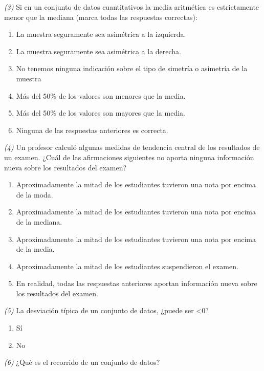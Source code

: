 \documentclass[
]{book}
\providecommand{\tightlist}{%
  \setlength{\itemsep}{0pt}\setlength{\parskip}{0pt}}
\theoremstyle{definition}
\theoremstyle{definition}
\theoremstyle{definition}
\theoremstyle{definition}
\theoremstyle{remark}
\begin{document}
\emph{(3)} Si en un conjunto de datos cuantitativos la media aritmética es estrictamente menor que la mediana (marca todas las respuestas correctas):

\begin{enumerate}
\def\labelenumi{\arabic{enumi}.}
\tightlist
\item
  La muestra seguramente sea asimétrica a la izquierda.
\item
  La muestra seguramente sea asimétrica a la derecha.
\item
  No tenemos ninguna indicación sobre el tipo de simetría o asimetría de la muestra
\item
  Más del 50\% de los valores son menores que la media.
\item
  Más del 50\% de los valores son mayores que la media.
\item
  Ninguna de las respuestas anteriores es correcta.
\end{enumerate}

\emph{(4)} Un profesor calculó algunas medidas de tendencia central de los resultados de un examen. ¿Cuál de las afirmaciones siguientes no aporta ninguna información nueva sobre los resultados del examen?

\begin{enumerate}
\def\labelenumi{\arabic{enumi}.}
\tightlist
\item
  Aproximadamente la mitad de los estudiantes tuvieron una nota por encima de la moda.
\item
  Aproximadamente la mitad de los estudiantes tuvieron una nota por encima de la mediana.
\item
  Aproximadamente la mitad de los estudiantes tuvieron una nota por encima de la media.
\item
  Aproximadamente la mitad de los estudiantes suspendieron el examen.
\item
  En realidad, todas las respuestas anteriores aportan información nueva sobre los resultados del examen.
\end{enumerate}

\emph{(5)} La desviación típica de un conjunto de datos, ¿puede ser \textless0?

\begin{enumerate}
\def\labelenumi{\arabic{enumi}.}
\tightlist
\item
  Sí
\item
  No
\end{enumerate}

\emph{(6)} ¿Qué es el recorrido de un conjunto de datos?
\end{document}
